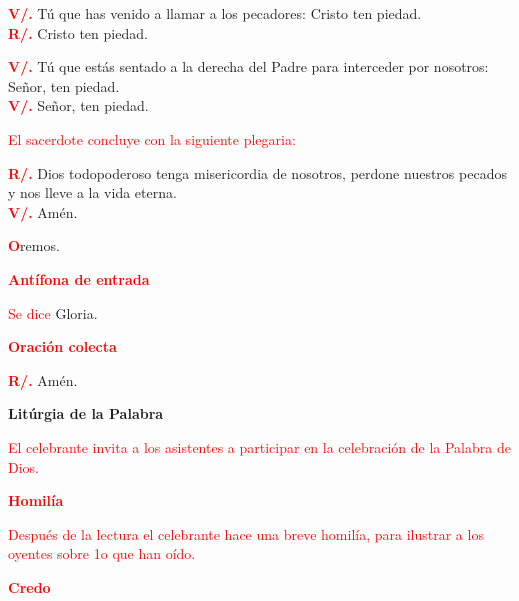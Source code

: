 \documentclass[12pt, letterpaper]{article}
\begin{document}
  \noindent
  \Large {\bfseries \textcolor{red}{V/.}} \hspace{1cm} T\'u que has venido a llamar a los pecadores: Cristo ten piedad.\\
  \noindent
  \Large {\bfseries \textcolor{red}{R/.}} \hspace{1cm} Cristo ten piedad.

  \noindent
  \Large {\bfseries \textcolor{red}{V/.}} \hspace{1cm} T\'u que est\'as sentado a la derecha del Padre para interceder por nosotros: Se\~nor, ten piedad.\\
  \noindent
  {\bfseries \textcolor{red}{V/.}} \hspace{1cm} Se\~nor, ten piedad. 

  \large {\textcolor{red}{El sacerdote concluye con la siguiente plegaria:}}
  
  \Large {\bfseries \textcolor{red}{R/.}} \hspace{1cm} \Large Dios todopoderoso tenga misericordia de nosotros, perdone nuestros pecados y nos lleve a la vida eterna.\\
  \noindent
  \Large {\bfseries \textcolor{red}{V/.}} \hspace{1cm} Am\'en.

  \noindent
  \lettrine[lines=1]{\bfseries \textcolor{red}{O}}{}\Large {remos.}

  \Large {\bfseries \textcolor{red}{Ant\'ifona de entrada}}

  \large {\textcolor{red}{Se dice} Gloria.}

  \Large {\bfseries \textcolor{red}{Oraci\'on colecta}}

  \noindent
  \Large {\bfseries \textcolor{red}{R/.}} \hspace{1cm} Am\'en.

  \clearpage

  \begin{center}
    \Huge {\bfseries Lit\'urgia de la Palabra}
  \end{center}

  \large {\textcolor{red}{El celebrante invita a los asistentes a participar en la celebraci\'on de la Palabra de Dios.}} 

  \Large {\bfseries \textcolor{red}{Homil\'ia}}

  \large {\textcolor{red}{Despu\'es de la lectura el celebrante hace una breve homil\'ia, para ilustrar a los oyentes sobre 1o que han o\'ido.}}

  \Large {\bfseries \textcolor{red}{Credo}}
\end{document}
